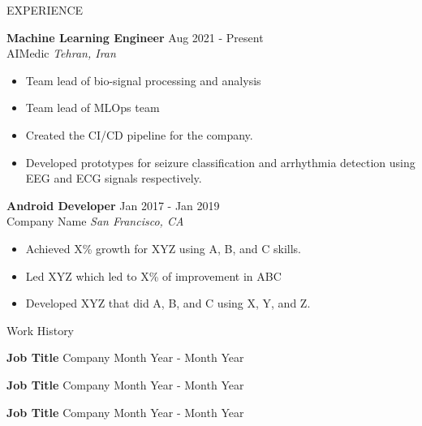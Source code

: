\documentclass{resume} %
\begin{document}
	 \begin{rSection}{EXPERIENCE}
		
		 \textbf{Machine Learning Engineer} \hfill Aug 2021 - Present\\
		 AIMedic \hfill \textit{Tehran, Iran}
		  \begin{itemize}
			     \itemsep -3pt {} 
			      \item Team lead of bio-signal processing and analysis
			      \item Team lead of MLOps team
				  \item Created the CI/CD pipeline for the company.
				  \item Developed prototypes for seizure classification and arrhythmia detection using EEG and ECG signals respectively.
			  \end{itemize}
		
		 \textbf{Android Developer} \hfill Jan 2017 - Jan 2019\\
		 Company Name \hfill \textit{San Francisco, CA}
		  \begin{itemize}
			     \itemsep -3pt {} 
			      \item Achieved X\% growth for XYZ using A, B, and C skills.
			      \item Led XYZ which led to X\% of improvement in ABC
			     \item Developed XYZ that did A, B, and C using X, Y, and Z. 
			  \end{itemize}
		
		 \end{rSection} 
	
	\begin{rSection}{Work History}
		\vspace{-1.25em}
		\item \textbf{Job Title} {Company} \hfill Month Year - Month Year
		\item \textbf{Job Title} {Company} \hfill Month Year - Month Year
		\item \textbf{Job Title} {Company} \hfill Month Year - Month Year
	\end{rSection} 
	
	
	
	
\end{document}
